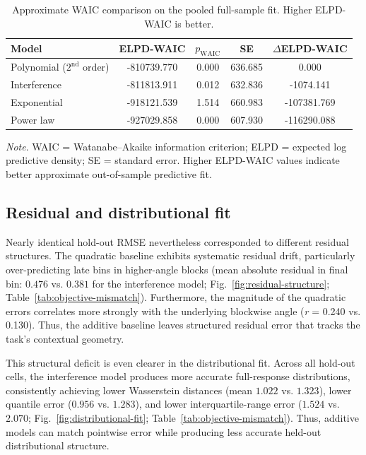 \documentclass[12pt]{article}
\newcommand{\tablenote}[1]{%
\vspace{0.35em}
\begin{flushleft}
\footnotesize\emph{Note}. #1
\end{flushleft}
}
\begin{document}
\begin{table}[htbp]
\centering
\caption{Approximate WAIC comparison on the pooled full-sample fit. Higher ELPD-WAIC is better.}
\label{tab:waic-comparison}
\small
\begin{tabular}{@{}lcccc@{}}
\toprule
Model & ELPD-WAIC & \(p_{\mathrm{WAIC}}\) & SE & \(\Delta\)ELPD-WAIC \\
\midrule
Polynomial (\(2^{\text{nd}}\) order) & -810739.770 & 0.000 & 636.685 & 0.000 \\
Interference & -811813.911 & 0.012 & 632.836 & -1074.141 \\
Exponential & -918121.539 & 1.514 & 660.983 & -107381.769 \\
Power law & -927029.858 & 0.000 & 607.930 & -116290.088 \\
\bottomrule
\end{tabular}
\tablenote{WAIC = Watanabe--Akaike information criterion; ELPD = expected log predictive density; SE = standard error. Higher ELPD-WAIC values indicate better approximate out-of-sample predictive fit.}
\end{table}

\subsection{Residual and distributional fit}
Nearly identical hold-out RMSE nevertheless corresponded to different residual structures. The quadratic baseline exhibits systematic residual drift, particularly over-predicting late bins in higher-angle blocks (mean absolute residual in final bin: $0.476$ vs. $0.381$ for the interference model; Fig.~\ref{fig:residual-structure}; Table~\ref{tab:objective-mismatch}). Furthermore, the magnitude of the quadratic errors correlates more strongly with the underlying blockwise angle (\textit{r} = 0.240 vs. 0.130). Thus, the additive baseline leaves structured residual error that tracks the task's contextual geometry.

This structural deficit is even clearer in the distributional fit. Across all hold-out cells, the interference model produces more accurate full-response distributions, consistently achieving lower Wasserstein distances (mean $1.022$ vs. $1.323$), lower quantile error ($0.956$ vs. $1.283$), and lower interquartile-range error ($1.524$ vs. $2.070$; Fig.~\ref{fig:distributional-fit}; Table~\ref{tab:objective-mismatch}). Thus, additive models can match pointwise error while producing less accurate held-out distributional structure.
\end{document}
